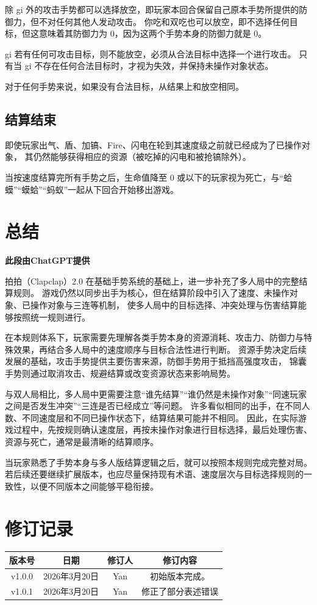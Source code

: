 \documentclass[12pt]{ctexart}
\begin{document}
除 gi 外的攻击手势都可以选择放空，即玩家本回合保留自己原本手势所提供的防御力，但不对任何其他人发动攻击。
你吃和双吃也可以放空，即不选择任何目标，但这意味着其防御力为 0，因为这两个手势本身的防御力就是 0。

gi 若有任何可攻击目标，则不能放空，必须从合法目标中选择一个进行攻击。
只有当 gi 不存在任何合法目标时，才视为失效，并保持未操作对象状态。

对于任何手势来说，如果没有合法目标，从结果上和放空相同。

\subsection{结算结束}

即使玩家出气、盾、加镐、Fire、闪电在轮到其速度级之前就已经成为了已操作对象，
其仍然能够获得相应的资源（被吃掉的闪电和被抢镐除外）。

当按速度结算完所有手势之后，生命值降至 0 或以下的玩家视为死亡，与“蛤蟆”“蟆蛤”“蚂蚁”一起从下回合开始移出游戏。

\section{总结}

\textbf{此段由ChatGPT提供}

拍拍（Clapclap）2.0 在基础手势系统的基础上，进一步补充了多人局中的完整结算规则。
游戏仍然以同步出手为核心，但在结算阶段中引入了速度、未操作对象、已操作对象与三连等机制，
使多人局中的目标选择、冲突处理与伤害结算能够按照统一规则进行。

在本规则体系下，玩家需要先理解各类手势本身的资源消耗、攻击力、防御力与特殊效果，再结合多人局中的速度顺序与目标合法性进行判断。
资源手势决定后续发展的基础，攻击手势提供主要伤害来源，防御手势用于抵挡高强度攻击，
锦囊手势则通过取消攻击、规避结算或改变资源状态来影响局势。

与双人局相比，多人局中更需要注意“谁先结算”“谁仍然是未操作对象”“同速玩家之间是否发生冲突”“三连是否已经成立”等问题。
许多看似相同的出手，在不同人数、不同速度层和不同已操作状态下，结算结果可能并不相同。
因此，在实际游戏过程中，先按规则确认速度层，再按未操作对象进行目标选择，最后处理伤害、资源与死亡，通常是最清晰的结算顺序。

当玩家熟悉了手势本身与多人版结算逻辑之后，就可以按照本规则完成完整对局。
若后续还要继续扩展版本，也应尽量保持现有术语、速度层次与目标选择规则的一致性，以便不同版本之间能够平稳衔接。

\newpage
\section*{修订记录}

\begin{center}
\begin{tabular}{|c|c|c|c|}
\hline
版本号 & 日期 & 修订人 & 修订内容 \\
\hline
v1.0.0 & 2026年3月20日 & Yan & 初始版本完成。 \\
\hline
v1.0.1 & 2026年3月20日 & Yan & 修正了部分表述错误 \\
\hline
\end{tabular}
\end{center}
\end{document}
